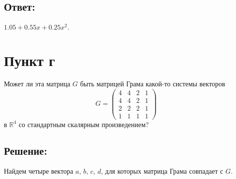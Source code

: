\documentclass[12pt]{article}
\begin{document}
    \subsection*{Ответ:}
    $1.05 + 0.55 x + 0.25 x^2$.

    \section*{Пункт г}
    Может ли эта матрица $G$ быть матрицей Грама какой-то системы векторов
    \[
        G
        =
        \begin{pmatrix}
            4 & 4 & 2 & 1 \\
            4 & 4 & 2 & 1 \\
            2 & 2 & 2 & 1 \\
            1 & 1 & 1 & 1
        \end{pmatrix}
    \]
    в $\mathbb{R}^4$ со стандартным скалярным произведением?

    \subsection*{Решение:}
    Найдем четыре вектора $a$, $b$, $c$, $d$, для которых матрица Грама совпадает с $G$.
\end{document}
